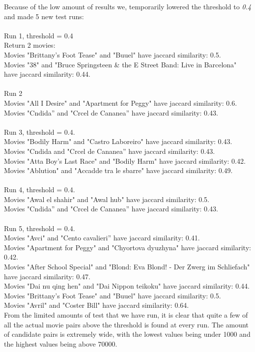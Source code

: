 Because of the low amount of results we, temporarily lowered the threshold to \textit{0.4} and made 5 new test runs: \\ \\
Run 1, threshold = 0.4 \\
Return 2 movies: \\
Movies "Brittany’s Foot Tease" and "Buuel" have jaccard similarity: 0.5. \\
Movies "38" and "Bruce Springsteen \& the E Street Band: Live in Barcelona" have jaccard similarity: 0.44. \\ \\
Run 2 \\
Movies "All I Desire" and "Apartment for Peggy" have jaccard similarity: 0.6. \\
Movies "Cndida” and "Crcel de Cananea” have jaccard similarity: 0.43. \\ \\
Run 3, threshold = 0.4. \\
Movies "Bodily Harm" and "Castro Laboreiro" have jaccard similarity: 0.43. \\
Movies "Cndida and "Crcel de Cananea” have jaccard similarity: 0.43. \\
Movies "Atta Boy’s Last Race" and "Bodily Harm" have jaccard similarity: 0.42. \\
Movies "Ablution" and "Accadde tra le sbarre" have jaccard similarity: 0.49. \\ \\
Run 4, threshold = 0.4. \\
Movies "Awal el shahir" and "Awal hub" have jaccard similarity: 0.5. \\
Movies "Cndida” and "Crcel de Cananea” have jaccard similarity: 0.43. \\ \\
Run 5, threshold = 0.4. \\
Movies "Avci" and "Cento cavalieri” have jaccard similarity: 0.41. \\
Movies "Apartment for Peggy" and "Chyortova dyuzhyna" have jaccard similarity: 0.42. \\
Movies "After School Special" and "Blond: Eva Blond! - Der Zwerg im Schliefach" have jaccard similarity: 0.47. \\
Movies "Dai nu qing hen" and "Dai Nippon teikoku" have jaccard similarity: 0.44. \\
Movies "Brittany’s Foot Tease" and "Buuel" have jaccard similarity: 0.5. \\
Movies "Avril" and "Coster Bill" have jaccard similarity: 0.64. \\

From the limited amounts of test that we have run, it is clear that quite a few of all the actual movie pairs above the threshold is found at every run. The amount of candidate pairs is extremely wide, with the lowest values being under 1000 and the highest values being above 70000.


